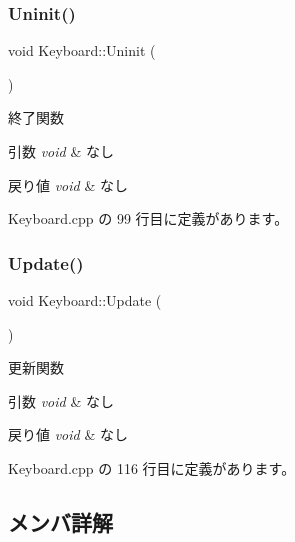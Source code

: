 \subsubsection{\texorpdfstring{Uninit()}{Uninit()}}
{\footnotesize\ttfamily void Keyboard\+::\+Uninit (\begin{DoxyParamCaption}{ }\end{DoxyParamCaption})}



終了関数 


\begin{DoxyParams}{引数}
{\em void} & なし \\
\hline
\end{DoxyParams}

\begin{DoxyRetVals}{戻り値}
{\em void} & なし \\
\hline
\end{DoxyRetVals}


 Keyboard.\+cpp の 99 行目に定義があります。

\mbox{\label{class_keyboard_a071313d0ae6538e9307ff6a059aa9197}} 
\subsubsection{\texorpdfstring{Update()}{Update()}}
{\footnotesize\ttfamily void Keyboard\+::\+Update (\begin{DoxyParamCaption}{ }\end{DoxyParamCaption})}



更新関数 


\begin{DoxyParams}{引数}
{\em void} & なし \\
\hline
\end{DoxyParams}

\begin{DoxyRetVals}{戻り値}
{\em void} & なし \\
\hline
\end{DoxyRetVals}


 Keyboard.\+cpp の 116 行目に定義があります。



\subsection{メンバ詳解}
\mbox{\label{class_keyboard_a490b43137055dd864119b4a37966445b}} 
